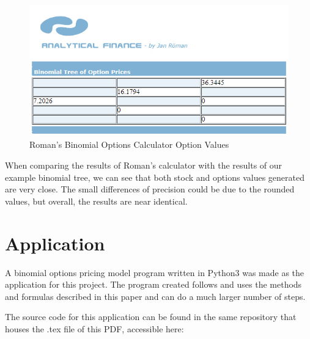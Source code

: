 \documentclass[12pt, letterpaper]{article}
\begin{document}
\begin{figure}[H]
  \includegraphics{Roman_binomial_calculator_option_values}
  \caption{Roman's Binomial Options Calculator Option Values}
\end{figure}

When comparing the results of Roman's calculator with the results of our example binomial tree, we can see that both stock and options values generated are very close.
The small differences of precision could be due to the rounded values, but overall, the results are near identical.

\section*{Application}
A binomial options pricing model program written in Python3 was made as the application for this project.
The program created follows and uses the methods and formulas described in this paper and can do a much larger number of steps.

The source code for this application can be found in the same repository that houses the .tex file of this PDF, accessible here:

\href{https://github.com/cliuj/binomial-options-pricing-model}{\color{blue}{https://github.com/cliuj/binomial-options-pricing-model}}
\end{document}
